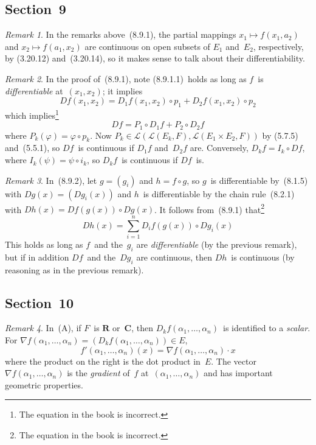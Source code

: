 \documentclass[letterpaper,12pt]{article}
\newcommand{\R}{\mathbf{R}}
\newcommand{\C}{\mathbf{C}}
\renewcommand{\L}{\mathcal{L}}
\newcommand{\after}{\circ}
\newcommand{\grad}{\nabla}
\theoremstyle{plain}
\theoremstyle{definition}
\theoremstyle{remark}
\newtheorem*{rmk}{Remark}
\begin{document}
\subsection*{Section~9}
\begin{rmk}
In the remarks above~(8.9.1), the partial mappings \(x_1\mapsto f(x_1,a_2)\) and \(x_2\mapsto f(a_1,x_2)\) are continuous on open subsets of \(E_1\) and~\(E_2\), respectively, by (3.20.12) and~(3.20.14), so it makes sense to talk about their differentiability.
\end{rmk}

\begin{rmk}
In the proof of~(8.9.1), note (8.9.1.1)~holds as long as \(f\)~is \emph{differentiable} at~\((x_1,x_2)\); it implies
\[Df(x_1,x_2)=D_1f(x_1,x_2)\after p_1+D_2f(x_1,x_2)\after p_2\]
which implies\footnote{The equation in the book is incorrect.}
\[Df=P_1\after D_1f+P_2\after D_2f\]
where \(P_k(\varphi)=\varphi\after p_k\). Now \(P_k\in\L(\L(E_k,F),\L(E_1\times E_2,F))\) by (5.7.5) and~(5.5.1), so \(Df\)~is continuous if \(D_1f\) and~\(D_2f\) are. Conversely, \(D_kf=I_k\after Df\), where \(I_k(\psi)=\psi\after i_k\), so \(D_kf\)~is continuous if \(Df\)~is.
\end{rmk}

\begin{rmk}
In~(8.9.2), let \(g=(g_i)\) and \(h=f\after g\), so \(g\)~is differentiable by~(8.1.5) with \(Dg(x)=(Dg_i(x))\) and \(h\)~is differentiable by the chain rule~(8.2.1) with \(Dh(x)=Df(g(x))\after Dg(x)\). It follows from~(8.9.1) that\footnote{The equation in the book is incorrect.}
\[Dh(x)=\sum_{i=1}^nD_if(g(x))\after Dg_i(x)\]
This holds as long as \(f\)~and the~\(g_i\) are \emph{differentiable} (by the previous remark), but if in addition \(Df\)~and the~\(Dg_i\) are continuous, then \(Dh\)~is continuous (by reasoning as in the previous remark).
\end{rmk}

\subsection*{Section~10}
\begin{rmk}
In~(A), if \(F\)~is \(\R\) or~\(\C\), then \(D_kf(\alpha_1,\ldots,\alpha_n)\)~is identified to a \emph{scalar}. For \(\grad f(\alpha_1,\ldots,\alpha_n)=(D_kf(\alpha_1,\ldots,\alpha_n))\in E\),
\[f'(\alpha_1,\ldots,\alpha_n)(x)=\grad f(\alpha_1,\ldots,\alpha_n)\cdot x\]
where the product on the right is the dot product in~\(E\). The vector \(\grad f(\alpha_1,\ldots,\alpha_n)\) is the \emph{gradient} of~\(f\) at~\((\alpha_1,\ldots,\alpha_n)\) and has important geometric properties.
\end{rmk}
\end{document}
